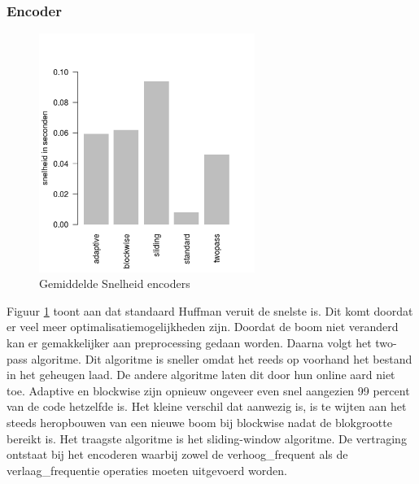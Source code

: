 \documentclass[twoside,twocolumn]{article}
\begin{document}
        \subsubsection{Encoder}
            \begin{figure}[H]
                \begin{center}
                     \includegraphics[width=7cm]{images/snelheid-tekst.png}    
                \end{center}
                \caption{Gemiddelde Snelheid encoders}
                \label{compressie-vgl}
            \end{figure}
        
        Figuur \ref{compressie-vgl} toont aan dat standaard Huffman veruit de snelste is. Dit komt doordat er veel meer optimalisatiemogelijkheden zijn. Doordat de boom niet veranderd kan er gemakkelijker aan preprocessing gedaan worden.
        Daarna volgt het two-pass algoritme. Dit algoritme is sneller omdat het reeds op voorhand het bestand in het geheugen laad. De andere algoritme laten dit door hun online aard niet toe. Adaptive en blockwise zijn opnieuw ongeveer even snel aangezien 99 percent van de code hetzelfde is. Het kleine verschil dat aanwezig is, is te wijten aan het steeds heropbouwen van een nieuwe boom bij blockwise nadat de blokgrootte bereikt is. Het traagste algoritme is het sliding-window algoritme. De vertraging ontstaat bij het encoderen waarbij zowel de verhoog\_frequent als de verlaag\_frequentie operaties moeten uitgevoerd worden.
\end{document}
